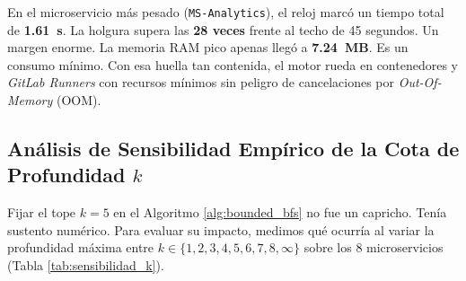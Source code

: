 \documentclass[conference]{IEEEtran}
\begin{document}
\begin{table}[!htbp]
\centering
\caption{Rendimiento Computacional y Consumo de Recursos de \textit{PyReach}}
\label{tab:benchmarks}
\small
{}
\end{table}

En el microservicio más pesado (\texttt{MS-Analytics}), el reloj marcó un tiempo total de \textbf{1.61~s}. La holgura supera las \textbf{28 veces} frente al techo de 45 segundos. Un margen enorme. La memoria RAM pico apenas llegó a \textbf{7.24~MB}. Es un consumo mínimo. Con esa huella tan contenida, el motor rueda en contenedores y \textit{GitLab Runners} con recursos mínimos sin peligro de cancelaciones por \textit{Out-Of-Memory} (OOM).

\subsection{Análisis de Sensibilidad Empírico de la Cota de Profundidad $k$}
Fijar el tope $k=5$ en el Algoritmo \ref{alg:bounded_bfs} no fue un capricho. Tenía sustento numérico. Para evaluar su impacto, medimos qué ocurría al variar la profundidad máxima entre $k \in \{1, 2, 3, 4, 5, 6, 7, 8, \infty\}$ sobre los 8 microservicios (Tabla \ref{tab:sensibilidad_k}).
\end{document}
